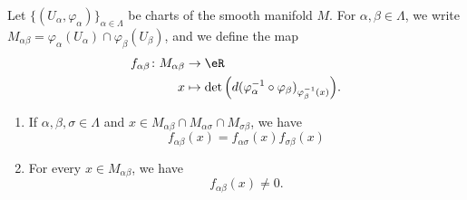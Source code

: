 \begin{lemma}		\label{LEMooYMIYooUDOhyR}
	Let \( \{ (U_{\alpha},\varphi_{\alpha}) \}_{\alpha\in \Lambda}\) be charts of the smooth manifold \( M\). For \( \alpha,\beta\in\Lambda\), we write \( M_{\alpha\beta}=\varphi_{\alpha}(U_{\alpha})\cap \varphi_{\beta}(U_{\beta})\), and we define the map
	\begin{equation}
		\begin{aligned}
			f_{\alpha\beta}\colon M_{\alpha\beta} & \to \eR                                                                                          \\
			x                                     & \mapsto \det\Big( d(\varphi_{\alpha}^{-1}\circ \varphi_{\beta})_{\varphi_{\beta}^{-1}(x)} \Big).
		\end{aligned}
	\end{equation}

	\begin{enumerate}
		\item		\label{ITEMooLHBBooFxUTHJ}
		      If \( \alpha,\beta,\sigma\in \Lambda\) and \( x\in M_{\alpha\beta}\cap M_{\alpha\sigma}\cap M_{\sigma\beta}\), we have
		      \begin{equation}
			      f_{\alpha\beta}(x)=f_{\alpha\sigma}(x)f_{\sigma\beta}(x)
		      \end{equation}
		\item		\label{ITEMooURXTooRWnYsV}
		      For every \( x\in M_{\alpha\beta}\), we have
		      \begin{equation}
			      f_{\alpha\beta}(x)\neq 0.
		      \end{equation}
	\end{enumerate}
\end{lemma}


